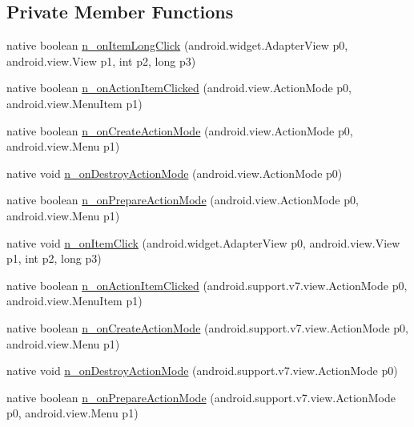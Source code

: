 \subsection*{Private Member Functions}
\begin{CompactItemize}
\item 
native boolean \hyperlink{classmd5b60ffeb829f638581ab2bb9b1a7f4f3f_1_1_cell_adapter_5301628c9f5025605e0c12a308a87705}{n\_\-onItemLongClick} (android.widget.AdapterView p0, android.view.View p1, int p2, long p3)
\item 
native boolean \hyperlink{classmd5b60ffeb829f638581ab2bb9b1a7f4f3f_1_1_cell_adapter_c87b7ef02f8bf331b2f74e970f872e74}{n\_\-onActionItemClicked} (android.view.ActionMode p0, android.view.MenuItem p1)
\item 
native boolean \hyperlink{classmd5b60ffeb829f638581ab2bb9b1a7f4f3f_1_1_cell_adapter_fa3d0eff290c0ee14f10b4dc20799c00}{n\_\-onCreateActionMode} (android.view.ActionMode p0, android.view.Menu p1)
\item 
native void \hyperlink{classmd5b60ffeb829f638581ab2bb9b1a7f4f3f_1_1_cell_adapter_3dab8c32f57edad8c9c66d9944a5fcc2}{n\_\-onDestroyActionMode} (android.view.ActionMode p0)
\item 
native boolean \hyperlink{classmd5b60ffeb829f638581ab2bb9b1a7f4f3f_1_1_cell_adapter_2b208b6906f76ea8618d4a8fdfd42930}{n\_\-onPrepareActionMode} (android.view.ActionMode p0, android.view.Menu p1)
\item 
native void \hyperlink{classmd5b60ffeb829f638581ab2bb9b1a7f4f3f_1_1_cell_adapter_b7cc9e422e966560e28f28619fdbdb58}{n\_\-onItemClick} (android.widget.AdapterView p0, android.view.View p1, int p2, long p3)
\item 
native boolean \hyperlink{classmd5b60ffeb829f638581ab2bb9b1a7f4f3f_1_1_cell_adapter_671a301aea8b82bb20f32bfd1147767f}{n\_\-onActionItemClicked} (android.support.v7.view.ActionMode p0, android.view.MenuItem p1)
\item 
native boolean \hyperlink{classmd5b60ffeb829f638581ab2bb9b1a7f4f3f_1_1_cell_adapter_a35d121a32d8f37e712467c591e1e051}{n\_\-onCreateActionMode} (android.support.v7.view.ActionMode p0, android.view.Menu p1)
\item 
native void \hyperlink{classmd5b60ffeb829f638581ab2bb9b1a7f4f3f_1_1_cell_adapter_ebfeb57150c2efac7eaeeb5271f7a5fa}{n\_\-onDestroyActionMode} (android.support.v7.view.ActionMode p0)
\item 
native boolean \hyperlink{classmd5b60ffeb829f638581ab2bb9b1a7f4f3f_1_1_cell_adapter_8a9bdd2e1b8da9b7efff9f1252e170d3}{n\_\-onPrepareActionMode} (android.support.v7.view.ActionMode p0, android.view.Menu p1)
\end{CompactItemize}
